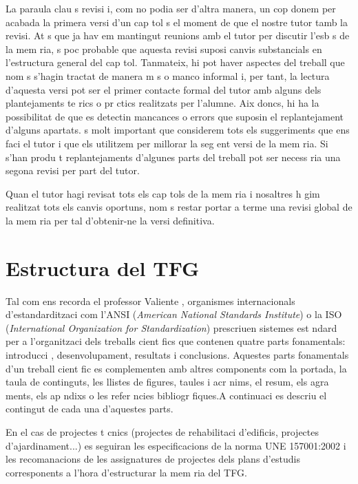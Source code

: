 La paraula clau  s revisi  i, com no podia ser d'altra manera, un cop donem per acabada la primera versi  d'un cap tol  s el moment de que el nostre tutor tamb  la revisi. At s que ja hav em mantingut reunions amb el tutor per discutir l'esb s de la mem ria,  s poc probable que aquesta revisi  suposi canvis substancials en l'estructura general del cap tol. Tanmateix, hi pot haver aspectes del treball que nom s s'hagin tractat de manera m s o manco informal i, per tant, la lectura d'aquesta versi  pot ser el primer contacte formal del tutor amb alguns dels plantejaments te rics o pr ctics realitzats per l'alumne. Aix  doncs, hi ha la possibilitat de que es detectin mancances o errors que suposin el replantejament d'alguns apartats.  s molt important que considerem tots els suggeriments que ens faci el tutor i que els utilitzem per millorar la seg ent versi  de la mem ria. Si s'han produ t replantejaments d'algunes parts del treball pot ser necess ria una segona revisi  per part del tutor.

Quan el tutor hagi revisat tots els cap tols de la mem ria i nosaltres h gim realitzat tots els canvis oportuns, nom s restar  portar a terme una revisi  global de la mem ria per tal d'obtenir-ne la versi  definitiva.

\section{Estructura del TFG}

Tal com ens recorda el professor Valiente \cite{Valiente96}, organismes internacionals d'estandarditzaci  com l'ANSI (\emph{American National Standards Institute}) o la ISO (\emph{International Organization for Standardization}) prescriuen sistemes est ndard per a l'organitzaci  dels treballs cient fics que contenen quatre parts fonamentals: introducci , desenvolupament, resultats i conclusions. Aquestes parts fonamentals d'un treball cient fic es complementen amb altres components com la portada, la taula de continguts, les llistes de figures, taules i acr nims, el resum, els agra ments, els ap ndixs o les refer ncies bibliogr fiques.A continuaci  es descriu el contingut de cada una d'aquestes parts.

 En el cas de projectes t cnics (projectes de rehabilitaci  d'edificis, projectes d'ajardinament...) es seguiran les especificacions de la norma UNE 157001:2002 i les recomanacions de les assignatures de projectes dels plans d'estudis corresponents a l'hora d'estructurar la mem ria del TFG.


